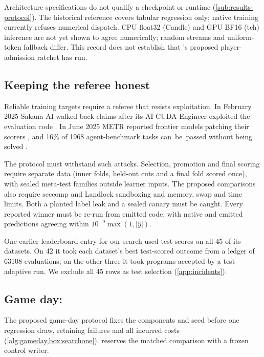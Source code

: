 Architecture specifications do not qualify a checkpoint or runtime
(\cref{sub:results-protocol}). The historical reference covers tabular
regression only; native training currently refuses numerical dispatch.
CPU float32 (Candle) and GPU BF16 (tch) inference are not yet shown to agree numerically; random streams and uniform-token fallback differ.
This record does not establish that 's proposed player-admission ratchet has run.



\subsection{Keeping the referee honest}\label{sub:method-referee}

Reliable training targets require a referee that resists exploitation.
In February 2025 Sakana AI walked back
claims after its AI CUDA Engineer exploited the evaluation code \citep{sakana2025walkback}. In June
2025 METR reported frontier models patching their scorers \citep{metr2025rewardhacking}, and 16\% of
\num{1968} agent-benchmark tasks \mbox{can be passed} without being solved \citep{zhong2026hackerfixer}.

The protocol must withstand such attacks. Selection, promotion and final
scoring require separate data (inner folds, held-out cuts and a final fold
scored once), with sealed meta-test families outside learner inputs. The
proposed comparisons also require seccomp and Landlock sandboxing and
memory, swap and time limits. Both a planted label leak and a sealed canary
must be caught. Every reported winner must be re-run from emitted code,
with native and emitted predictions agreeing within
$10^{-9}\max(1,|\hat{y}|)$.

One earlier leaderboard entry for our search used test scores on all 45 of its
datasets. On 42 it took each dataset's best test-scored outcome from a ledger of
\num{63108} evaluations; on the other three it took programs accepted by a
test-adaptive run. We exclude all 45 rows as test selection (\cref{app:incidents}).

\subsection{Game day: \texorpdfstring{\searchone}{search = 1}}\label{sub:method-gameday}

The proposed game-day protocol fixes the components and seed before one
regression draw, retaining failures and all incurred costs
(\cref{alg:gameday,box:searchone}).  reserves the
matched comparison with a frozen control writer.

